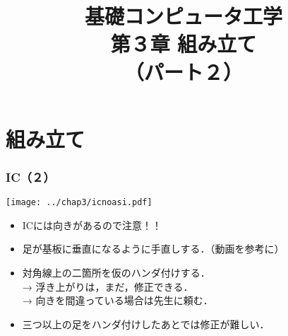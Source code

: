 \documentclass{beamer}                 %
\begin{document}
\title{基礎コンピュータ工学\\第３章 組み立て\\（パート２）}
\date{}

\begin{frame}
  \titlepage
\end{frame}


\section{組み立て}

\begin{frame}
  \frametitle{IC（２）}
  \vfill
  \centerline{\texttt{[image: ../chap3/icnoasi.pdf]}}
  \vfill
  \begin{itemize}
  \item ICには向きがあるので注意！！
  \item 足が基板に垂直になるように手直しする．（動画を参考に）
  \item 対角線上の二箇所を仮のハンダ付けする．\\
    → 浮き上がりは，まだ，修正できる．\\
    → 向きを間違っている場合は先生に頼む．
  \item 三つ以上の足をハンダ付けしたあとでは修正が難しい．
  \end{itemize}
\end{frame}
\end{document}
